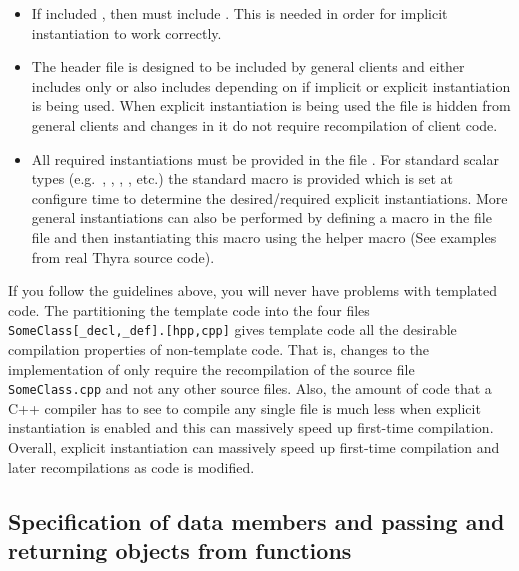 \begin{itemize}
\begin{itemize}
{}\item If {} included
{}, then {} must include
{}.  This is needed in order for implicit
instantiation to work correctly.

{}\item The header file {} is designed to be included by
general clients and either includes only {} or also
includes {} depending on if implicit or explicit
instantiation is being used.  When explicit instantiation is being used the
file {} is hidden from general clients and changes in
it do not require recompilation of client code.

{}\item All required instantiations must be provided in the file
{}.  For standard scalar types (e.g.\ {},
{}, {}, {},
etc.) the standard macro
{} is provided
which is set at configure time to determine the desired/required explicit
instantiations.  More general instantiations can also be performed by defining
a macro in the file {} file and then instantiating
this macro using the helper macro
{} (See examples
from real Thyra source code).

\end{itemize}

If you follow the guidelines above, you will never have problems with
templated code.  The partitioning the template code into the four files
{}\texttt{SomeClass[\_decl,\_def].[hpp,cpp]} gives template code all the
desirable compilation properties of non-template code.  That is, changes to
the implementation of {} only require the recompilation of the
source file {}\texttt{SomeClass.cpp} and not any other source files.  Also,
the amount of code that a C++ compiler has to see to compile any single
{} file is much less when explicit instantiation is enabled and
this can massively speed up first-time compilation.  Overall, explicit
instantiation can massively speed up first-time compilation and later
recompilations as code is modified.


\end{itemize}


%
{}\subsection{Specification of data members and passing and returning
objects from functions}
\label{sec:func_arguments}
%

